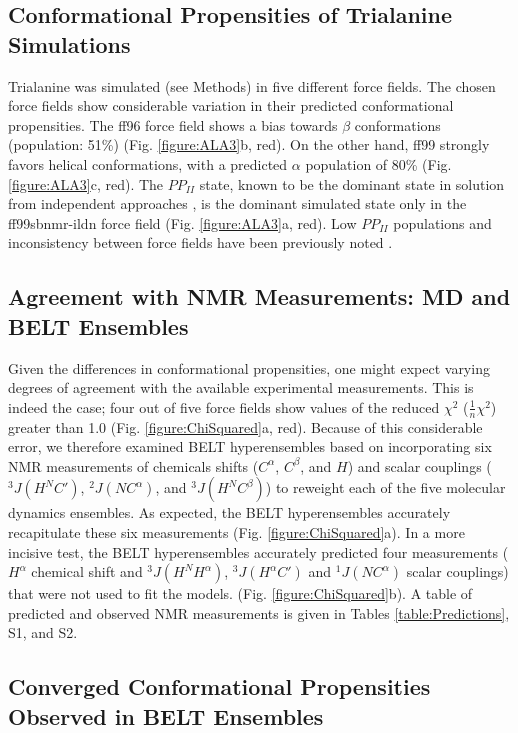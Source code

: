 \documentclass[journal=jacsat,manuscript=article]{achemso}
\begin{document}
\subsection*{Conformational Propensities of Trialanine Simulations}

Trialanine was simulated (see Methods) in five different force fields.  The chosen force fields show considerable variation in their predicted conformational propensities.  The ff96 force field shows a bias towards $\beta$ conformations (population: 51\%) (Fig. \ref{figure:ALA3}b, red).  On the other hand, ff99 strongly favors helical conformations, with a predicted $\alpha$ population of 80\% (Fig. \ref{figure:ALA3}c, red).  The $PP_{II}$ state, known to be the dominant state in solution from independent approaches \cite{Grdadolnik2011, Graf2007, Avbelj2006}, is the dominant simulated state only in the ff99sbnmr-ildn force field (Fig. \ref{figure:ALA3}a, red).  Low $PP_{II}$ populations and inconsistency between force fields have been previously noted \cite{Graf2007, beauchamp2012protein, nerenberg2011, best2008}.  

\subsection*{Agreement with NMR Measurements: MD and BELT Ensembles}

Given the differences in conformational propensities, one might expect varying degrees of agreement with the available experimental measurements.  This is indeed the case; four out of five force fields show values of the reduced $\chi^2$ ($\frac{1}{n} \chi^2$) greater than 1.0 (Fig. \ref{figure:ChiSquared}a, red).  Because of this considerable error, we therefore examined BELT hyperensembles based on incorporating six NMR measurements of chemicals shifts ($C^\alpha$, $C^\beta$, and $H$) and scalar couplings ($^3J(H^N C')$,  $^2J(N C^\alpha)$, and $^3J(H^N C^\beta)$) to reweight each of the five molecular dynamics ensembles.  As expected, the BELT hyperensembles accurately recapitulate these six measurements (Fig. \ref{figure:ChiSquared}a).  In a more incisive test, the BELT hyperensembles accurately predicted four measurements ($H^\alpha$ chemical shift and $^3J(H^N H^\alpha)$, $^3J(H^\alpha C')$ and $^1J(N C^\alpha)$ scalar couplings) that were not used to fit the models.   (Fig. \ref{figure:ChiSquared}b).  
A table of predicted and observed NMR measurements is given in Tables \ref{table:Predictions}, S1, and S2.  

\subsection*{Converged Conformational Propensities Observed in BELT Ensembles}
\end{document}
